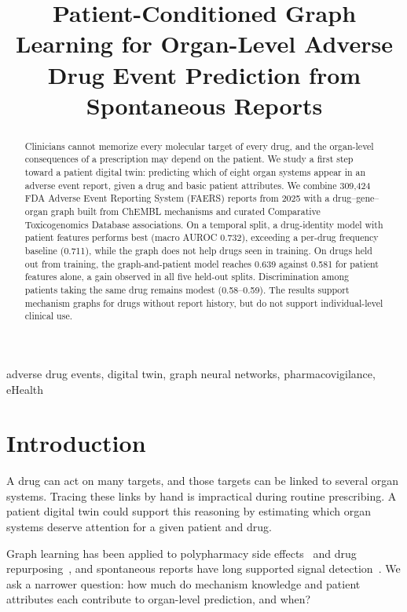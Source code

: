 \documentclass[conference,a4paper]{IEEEtran}
\begin{document}
\title{Patient-Conditioned Graph Learning for Organ-Level Adverse Drug Event Prediction from Spontaneous Reports}
\author{
}
\maketitle

\begin{abstract}
Clinicians cannot memorize every molecular target of every drug, and the organ-level consequences of a prescription may depend on the patient. We study a first step toward a patient digital twin: predicting which of eight organ systems appear in an adverse event report, given a drug and basic patient attributes. We combine 309,424 FDA Adverse Event Reporting System (FAERS) reports from 2025 with a drug--gene--organ graph built from ChEMBL mechanisms and curated Comparative Toxicogenomics Database associations. On a temporal split, a drug-identity model with patient features performs best (macro AUROC 0.732), exceeding a per-drug frequency baseline (0.711), while the graph does not help drugs seen in training. On drugs held out from training, the graph-and-patient model reaches 0.639 against 0.581 for patient features alone, a gain observed in all five held-out splits. Discrimination among patients taking the same drug remains modest (0.58--0.59). The results support mechanism graphs for drugs without report history, but do not support individual-level clinical use.
\end{abstract}

\begin{IEEEkeywords}
adverse drug events, digital twin, graph neural networks, pharmacovigilance, eHealth
\end{IEEEkeywords}

\section{Introduction}
A drug can act on many targets, and those targets can be linked to several organ systems. Tracing these links by hand is impractical during routine prescribing. A patient digital twin could support this reasoning by estimating which organ systems deserve attention for a given patient and drug.

Graph learning has been applied to polypharmacy side effects~\cite{zitnik2018} and drug repurposing~\cite{huang2024}, and spontaneous reports have long supported signal detection~\cite{tatonetti2012}. We ask a narrower question: how much do mechanism knowledge and patient attributes each contribute to organ-level prediction, and when?
\end{document}
